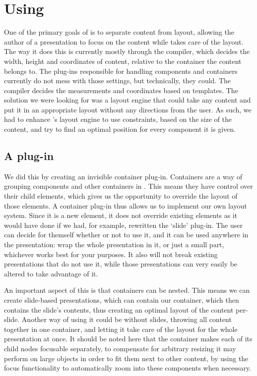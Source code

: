   \section{Using \mxp}

   One of the primary goals of \mxp is to separate content from layout,
   allowing the author of a presentation to focus on the content while \mxp
   takes care of the layout. The way it does this is currently mostly through
   the compiler, which decides the width, height and coordinates of content,
   relative to the container the content belongs to. The plug-ins responsible
   for handling components and containers currently do not mess with those
   settings, but technically, they could. The compiler decides the measurements
   and coordinates based on templates. The solution we were looking for was a
   layout engine that could take any content and put it in an appropriate
   layout without any directions from the user. As such, we had to enhance
   \mxp's layout engine to use constraints, based on the size of the content,
   and try to find an optimal position for every component it is given.

   \subsection{A \mxp plug-in}
    \label{mxp-plug-in}

    We did this by creating an invisible container plug-in. Containers are a
    way of grouping components and other containers in \mxp. This means they
    have control over their child elements, which gives us the opportunity to
    override the layout of those elements. A container plug-in thus allows us
    to implement our own layout system. Since it is a new element, it does not
    override existing elements as it would have done if we had, for example,
    rewritten the `slide' plug-in. The user can decide for themself whether or
    not to use it, and it can be used anywhere in the presentation: wrap the
    whole presentation in it, or just a small part, whichever works best for
    your purposes. It also will not break existing presentations that do not
    use it, while those presentations can very easily be altered to take
    advantage of it.

    An important aspect of this is that containers can be nested. This means we
    can create slide-based presentations, which can contain our
     container, which then contains the slide's contents, thus
    creating an optimal layout of the content per-slide. Another way of using
    it could be without slides, throwing all content together in one
     container, and letting it take care of the layout for the
    whole presentation at once. It should be noted here that the
     container makes each of its child nodes focusable
    separately, to compensate for arbitrary resizing it may perform on large
    objects in order to fit them next to other content, by using the focus
    functionality to automatically zoom into these components when necessary.
  
